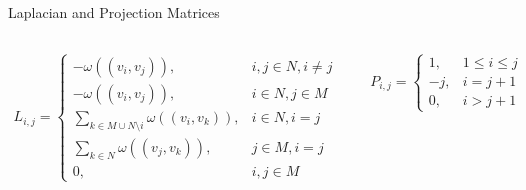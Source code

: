 \begin{frame}{Laplacian and Projection Matrices}
	\begin{columns}
		\begin{align*}
			L_{i, j} = \begin{cases}
				           -\omega((v_i, v_j)),                                  & i, j \in N, i \ne j \\
				           -\omega((v_i, v_j)),                                  & i \in N, j \in M    \\
				           \sum_{k \in M \cup N \setminus i} \omega((v_i, v_k)), & i \in N, i = j      \\
				           \sum_{k \in N} \omega((v_j, v_k)),                    & j \in M, i = j      \\
				           0,                                                    & i, j \in M
			           \end{cases}
		\end{align*}

		\begin{align*}
			P_{i, j} = \begin{cases}
				           1,  & 1 \le i \le j \\
				           -j, & i = j + 1     \\
				           0,  & i > j + 1
			           \end{cases}
		\end{align*}

	\end{columns}
\end{frame}
